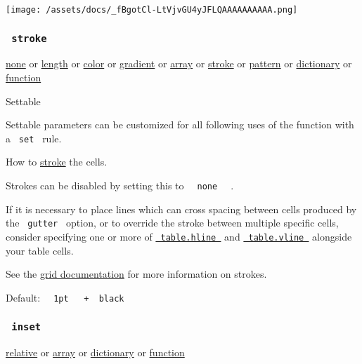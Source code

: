 \texttt{[image: /assets/docs/\_fBgotCl-LtVjvGU4yJFLQAAAAAAAAAA.png]}

\subsubsection{\texorpdfstring{\texttt{\ stroke\ }}{ stroke }}\label{parameters-stroke}

\href{/docs/reference/foundations/none/}{none} {or}
\href{/docs/reference/layout/length/}{length} {or}
\href{/docs/reference/visualize/color/}{color} {or}
\href{/docs/reference/visualize/gradient/}{gradient} {or}
\href{/docs/reference/foundations/array/}{array} {or}
\href{/docs/reference/visualize/stroke/}{stroke} {or}
\href{/docs/reference/visualize/pattern/}{pattern} {or}
\href{/docs/reference/foundations/dictionary/}{dictionary} {or}
\href{/docs/reference/foundations/function/}{function}

{{ Settable }}

\label{parameters-stroke-settable-tooltip}
Settable parameters can be customized for all following uses of the
function with a \texttt{\ set\ } rule.

How to \href{/docs/reference/visualize/stroke/}{stroke} the cells.

Strokes can be disabled by setting this to
\texttt{\ }{\texttt{\ none\ }}\texttt{\ } .

If it is necessary to place lines which can cross spacing between cells
produced by the \texttt{\ gutter\ } option, or to override the stroke
between multiple specific cells, consider specifying one or more of
\href{/docs/reference/model/table/\#definitions-hline}{\texttt{\ table.hline\ }}
and
\href{/docs/reference/model/table/\#definitions-vline}{\texttt{\ table.vline\ }}
alongside your table cells.

See the \href{/docs/reference/layout/grid/\#parameters-stroke}{grid
documentation} for more information on strokes.

Default:
\texttt{\ }{\texttt{\ 1pt\ }}\texttt{\ }{\texttt{\ +\ }}\texttt{\ black\ }

\subsubsection{\texorpdfstring{\texttt{\ inset\ }}{ inset }}\label{parameters-inset}

\href{/docs/reference/layout/relative/}{relative} {or}
\href{/docs/reference/foundations/array/}{array} {or}
\href{/docs/reference/foundations/dictionary/}{dictionary} {or}
\href{/docs/reference/foundations/function/}{function}

